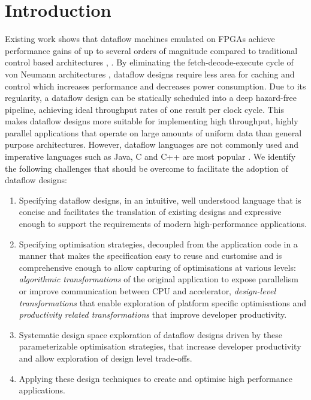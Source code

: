 \section{Introduction}

Existing work shows that dataflow machines emulated on FPGAs achieve
performance gains of up to several orders of magnitude compared to
traditional control based architectures \cite{Flynn:Pell:Mencer:2012},
\cite{Mencer:2012}. By eliminating the fetch-decode-execute cycle of
von Neumann architectures \cite{Neumann:1993}, dataflow designs
require less area for caching and control which increases performance
and decreases power consumption. Due to its regularity, a dataflow
design can be statically scheduled into a deep hazard-free pipeline,
achieving ideal throughput rates of one result per clock cycle. This
makes dataflow designs more suitable for implementing high throughput,
highly parallel applications that operate on large amounts of uniform
data than general purpose architectures. However, dataflow languages
are not commonly used and imperative languages such as Java, C and C++
are most popular \cite{Tiobe:2012}. We identify the following
challenges that should be overcome to facilitate the adoption of
dataflow designs:
\begin{enumerate}
\item Specifying dataflow designs, in an intuitive, well understood
  language that is concise and facilitates the translation of existing
  designs and expressive enough to support the requirements of modern
  high-performance applications.
\item Specifying optimisation strategies, decoupled from the
  application code in a manner that makes the specification easy to
  reuse and customise and is comprehensive enough to allow capturing
  of optimisations at various levels: \emph{algorithmic
    transformations} of the original application to expose parallelism
  or improve communication between CPU and accelerator,
  \emph{design-level transformations} that enable exploration of
  platform specific optimisations and \emph{productivity related
    transformations} that improve developer productivity.
\item Systematic design space exploration of dataflow designs driven
  by these parameterizable optimisation strategies, that increase
  developer productivity and allow exploration of design level
  trade-offs.
\item Applying these design techniques to create and optimise high
  performance applications.
\end{enumerate}

